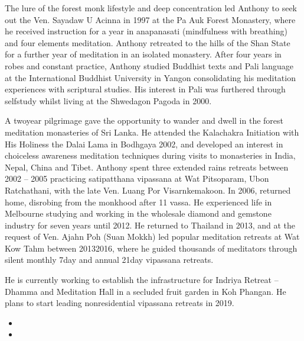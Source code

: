 \documentclass[letterpaper,10pt,english]{sphinxmanual}
\begin{document}
\sphinxAtStartPar
The lure of the forest monk lifestyle and deep concentration led Anthony
to seek out the Ven. Sayadaw U Acinna in 1997 at the Pa Auk Forest Monastery, where he received instruction for a year in anapanasati (mindfulness
with breathing) and four elements meditation. Anthony retreated to the hills
  of the Shan State for a further year of meditation in an isolated monastery.
After four years in robes and constant practice, Anthony studied Buddhist
texts and Pali language at the International Buddhist University in Yangon
consolidating his meditation experiences with scriptural studies. His interest in Pali was furthered through self\sphinxhyphen{}study whilst living at the Shwedagon
Pagoda in 2000.

\sphinxAtStartPar
A two\sphinxhyphen{}year pilgrimage gave the opportunity to wander and dwell in the
forest meditation monasteries of Sri Lanka. He attended the Kalachakra Initiation with His Holiness the Dalai Lama in Bodhgaya 2002, and developed
an  interest  in  choiceless  awareness  meditation  techniques  during  visits  to
monasteries in India, Nepal, China and Tibet.  Anthony spent three extended
rains retreats between 2002 – 2005 practicing satipatthana vipassana at Wat
Pitsoparam, Ubon Ratchathani, with the late Ven. Luang Por Visarnkemakoon. In  2006, returned home, disrobing from the monkhood after 11 vassa.
He experienced life in Melbourne studying and working in the wholesale diamond and gemstone industry for seven years until 2012. He returned
to Thailand in 2013, and at the request of Ven. Ajahn Poh (Suan Mokkh) led
popular meditation retreats at Wat Kow Tahm between 2013\sphinxhyphen{}2016, where he
guided  thousands  of  meditators  through  silent  monthly  7\sphinxhyphen{}day    and  annual
21\sphinxhyphen{}day vipassana retreats.

\sphinxAtStartPar
{} He  is  currently  working  to  establish  the  infrastructure  for  Indriya
Retreat – Dhamma and Meditation Hall in a secluded fruit garden in Koh
Phangan. He plans to start leading non\sphinxhyphen{}residential vipassana retreats in 2019.
\begin{itemize}
\item {} 
\sphinxAtStartPar
{}

\item {} 
\sphinxAtStartPar
{}

\end{itemize}



\renewcommand{\indexname}{Index}
\printindex
\end{document}
